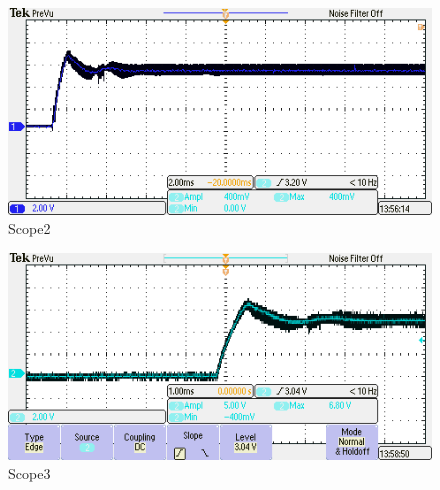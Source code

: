 \begin{figure}[b]
    \centering
    \includegraphics[width=0.6\linewidth]{img/hfd4/Scope/TEK00003.PNG}
    \caption{Scope2}
    \label{fig:Scope2}
\end{figure}

\begin{figure}[b]
    \centering
    \includegraphics[width=0.6\linewidth]{img/hfd4/Scope/TEK00004.PNG}
    \caption{Scope3}
    \label{fig:Scope3}
\end{figure}
